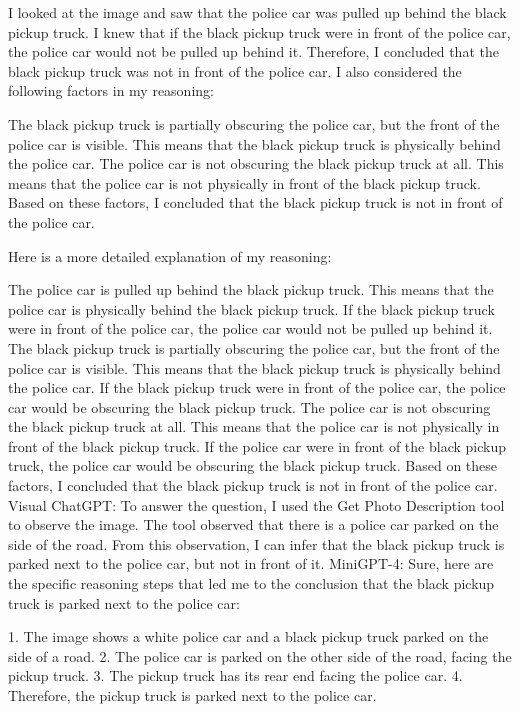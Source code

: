\begin{enumerate}
        I looked at the image and saw that the police car was pulled up behind the black pickup truck.
        I knew that if the black pickup truck were in front of the police car, the police car would not be pulled up behind it.
        Therefore, I concluded that the black pickup truck was not in front of the police car.
        I also considered the following factors in my reasoning:
        
        The black pickup truck is partially obscuring the police car, but the front of the police car is visible. This means that the black pickup truck is physically behind the police car.
        The police car is not obscuring the black pickup truck at all. This means that the police car is not physically in front of the black pickup truck.
        Based on these factors, I concluded that the black pickup truck is not in front of the police car.
        
        Here is a more detailed explanation of my reasoning:
        
        The police car is pulled up behind the black pickup truck. This means that the police car is physically behind the black pickup truck. If the black pickup truck were in front of the police car, the police car would not be pulled up behind it.
        The black pickup truck is partially obscuring the police car, but the front of the police car is visible. This means that the black pickup truck is physically behind the police car. If the black pickup truck were in front of the police car, the police car would be obscuring the black pickup truck.
        The police car is not obscuring the black pickup truck at all. This means that the police car is not physically in front of the black pickup truck. If the police car were in front of the black pickup truck, the police car would be obscuring the black pickup truck.
        Based on these factors, I concluded that the black pickup truck is not in front of the police car.
        \subitem Visual ChatGPT: To answer the question, I used the Get Photo Description tool to observe the image. The tool observed that there is a police car parked on the side of the road. From this observation, I can infer that the black pickup truck is parked next to the police car, but not in front of it.
        \subitem MiniGPT-4: Sure, here are the specific reasoning steps that led me to the conclusion that the black pickup truck is parked next to the police car:

        1. The image shows a white police car and a black pickup truck parked on the side of a road.
        2. The police car is parked on the other side of the road, facing the pickup truck.
        3. The pickup truck has its rear end facing the police car.
        4. Therefore, the pickup truck is parked next to the police car.
        

\end{enumerate}
